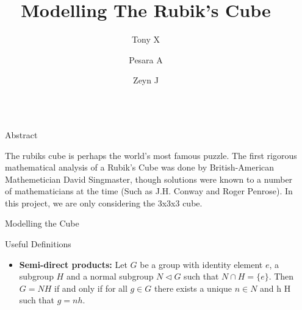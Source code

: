 \documentclass[final]{beamer}
\title{Modelling The Rubik's Cube}
\author{Tony X \inst{1} \and Pesara A \inst{1} \and Zeyn J \inst{1}}
\institute[shortinst]{\inst{1} McMaster University}
\newlength{\sepwidth}
\newlength{\colwidth}
\newcommand{\separatorcolumn}{\begin{column}{\sepwidth}\end{column}}
\begin{document}
\pgfmathsetmacro{}
\newcommand{\frontcolor}{red}
\newcommand{\sidecolor}{blue}
\begin{frame}[t]
\begin{columns}[t]
\separatorcolumn

\begin{column}{\colwidth}

  \begin{block}{Abstract}



    The rubiks cube is perhaps the world's most famous puzzle. 
    The first rigorous 
    mathematical analysis of a Rubik's Cube was done by British-American Mathemetician 
    David Singmaster, though solutions were known to a number of 
    mathematicians at the time (Such as J.H. Conway and Roger Penrose).  
    In this project, we are only considering the 3x3x3 cube.

  \end{block}

  \begin{block}{Modelling the Cube}


  \end{block}

  \begin{alertblock}{Useful Definitions}


    \begin{itemize}
      
  \item  \textbf{Semi-direct products:}
     Let $G$ be a group with identity element $e$, a subgroup $H$ and a normal subgroup $N \triangleleft G$ such that $N \cap H = \{e\}$.
    Then $G = N H$ if and only if for all $g \in G$ there exists a unique $n \in N$ and h \in H such that $g = nh$.


\end{itemize}
\end{alertblock}
\end{column}
\end{columns}
\end{frame}
\end{document}
